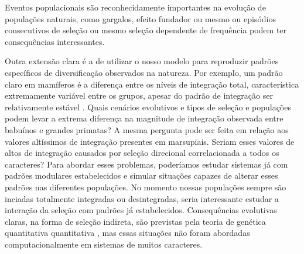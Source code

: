 Eventos populacionais são reconhecidamente importantes na evolução de
populações naturais, como gargalos, efeito fundador ou mesmo ou
episódios consecutivos de seleção ou mesmo seleção dependente de
frequência podem ter consequências interessantes. 

Outra extensão clara é a de utilizar o nosso modelo para reproduzir
padrões específicos de diversificação observados na natureza. 
Por exemplo, um padrão claro em mamíferos é a diferença entre os níveis
de integração total, característica extremamente variável entre os
grupos, apesar do padrão de integração ser relativamente estável
\cite{Porto2009}. 
Quais cenários evolutivos e tipos de seleção e populações podem levar a
extrema diferença na magnitude de integração observada entre babuínos e grandes
primatas?
A mesma pergunta pode ser feita em relação aos valores altíssimos de
integração presentes em marsupiais. 
Seriam esses valores de altos de integração causados por seleção
direcional correlacionada a todos os caracteres?
Para abordar esses problemas, poderíamos estudar sistemas já com padrões
modulares estabelecidos e simular situações capazes de alterar esses padrões 
nas diferentes populações. 
No momento nossas populações sempre são inciadas totalmente integradas
ou desintegradas, seria interessante estudar a interação da seleção com
padrões já estabelecidos.
Consequências evolutivas claras, na forma de seleção indireta, são
previstas pela teoria de genética quantitativa quantitativa
\citep{Lande1983, Barton1987}, mas essas situações não foram abordadas
computacionalmente em sistemas de muitos caracteres.


